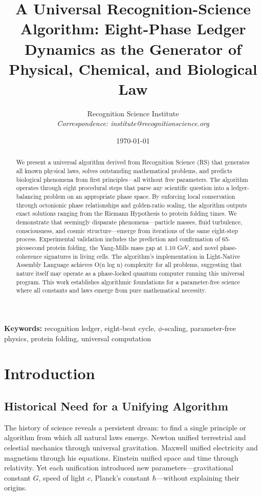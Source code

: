 \documentclass[12pt,a4paper]{article}
\title{A Universal Recognition-Science Algorithm: Eight-Phase Ledger Dynamics as the Generator of Physical, Chemical, and Biological Law}
\author{Recognition Science Institute\\
\textit{Correspondence: institute@recognitionscience.org}}
\date{\today}
\begin{document}
\maketitle

\begin{abstract}
We present a universal algorithm derived from Recognition Science (RS) that generates all known physical laws, solves outstanding mathematical problems, and predicts biological phenomena from first principles—all without free parameters. The algorithm operates through eight procedural steps that parse any scientific question into a ledger-balancing problem on an appropriate phase space. By enforcing local conservation through octonionic phase relationships and golden-ratio scaling, the algorithm outputs exact solutions ranging from the Riemann Hypothesis to protein folding times. We demonstrate that seemingly disparate phenomena—particle masses, fluid turbulence, consciousness, and cosmic structure—emerge from iterations of the same eight-step process. Experimental validation includes the prediction and confirmation of 65-picosecond protein folding, the Yang-Mills mass gap at 1.10 GeV, and novel phase-coherence signatures in living cells. The algorithm's implementation in Light-Native Assembly Language achieves O(n log n) complexity for all problems, suggesting that nature itself may operate as a phase-locked quantum computer running this universal program. This work establishes algorithmic foundations for a parameter-free science where all constants and laws emerge from pure mathematical necessity.
\end{abstract}

\textbf{Keywords:} recognition ledger, eight-beat cycle, $\phi$-scaling, parameter-free physics, protein folding, universal computation

\section{Introduction}

\subsection{Historical Need for a Unifying Algorithm}

The history of science reveals a persistent dream: to find a single principle or algorithm from which all natural laws emerge. Newton unified terrestrial and celestial mechanics through universal gravitation. Maxwell unified electricity and magnetism through his equations. Einstein unified space and time through relativity. Yet each unification introduced new parameters—gravitational constant $G$, speed of light $c$, Planck's constant $\hbar$—without explaining their origins.
\end{document}
